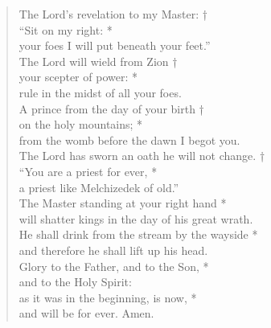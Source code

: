 \documentclass{article}
\begin{document}
\begin{verse}
The Lord’s revelation to my Master: † \\
“Sit on my right: * \\
your foes I will put beneath your feet.” \\

The Lord will wield from Zion † \\
your scepter of power: *\\
rule in the midst of all your foes. \\

A prince from the day of your birth † \\
on the holy mountains; * \\
from the womb before the dawn I begot you. \\

The Lord has sworn an oath he will not change. † \\
“You are a priest for ever, * \\
a priest like Melchizedek of old.” \\

The Master standing at your right hand * \\
will shatter kings in the day of his great wrath. \\

He shall drink from the stream by the wayside * \\
and therefore he shall lift up his head. \\

Glory to the Father, and to the Son, * \\
and to the Holy Spirit: \\
as it was in the beginning, is now, * \\
and will be for ever. Amen. \\
\end{verse}
\end{document}

